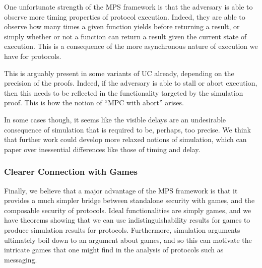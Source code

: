 One unfortunate strength of the MPS framework is that the adversary
is able to observe more timing properties of protocol execution.
Indeed, they are able to observe how many times a given function
yields before returning a result, or simply whether
or not a function can return a result given the current state of
execution.
This is a consequence of the more asynchronous nature
of execution we have for protocols.

This is arguably present in some variants of UC already,
depending on the precision of the proofs.
Indeed, if the adversary is able to stall or abort execution,
then this needs to be reflected in the functionality
targeted by the simulation proof.
This is how the notion of ``MPC with abort'' arises.

In some cases though, it seems like the visible
delays are an undesirable consequence of simulation that
is required to be, perhaps, too precise.
We think that further work could develop more relaxed notions of simulation,
which can paper over inessential differences like those of timing and delay.

\subsubsection*{Clearer Connection with Games}

Finally, we believe that a major advantage of the MPS framework is that
it provides a much simpler bridge between standalone security
with games, and the composable security of protocols.
Ideal functionalities are simply games,
and we have theorems showing that
we can use indistinguishability results for games to produce
simulation results for protocols.
Furthermore, simulation arguments ultimately boil down
to an argument about games, and so this can motivate the
intricate games that one might find in the analysis of protocols
such as messaging.

